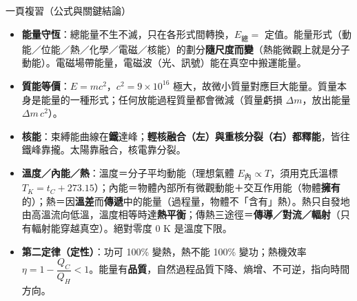 \documentclass[11pt]{article}
\begin{document}
\begin{補充框}{一頁複習（公式與關鍵結論）}
\begin{itemize}\setlength{\itemsep}{2pt}
\item \textbf{能量守恆}：總能量不生不滅，只在各形式間轉換，$E_{\text{總}}=$ 定值。能量形式（動能／位能／熱／化學／電磁／核能）的劃分\textbf{隨尺度而變}（熱能微觀上就是分子動能）。電磁場帶能量，電磁波（光、訊號）能在真空中搬運能量。
\item \textbf{質能等價}：$E=mc^2$，$c^2=9\times10^{16}$ 極大，故微小質量對應巨大能量。質量本身是能量的一種形式；任何放能過程質量都會微減（質量虧損 $\Delta m$，放出能量 $\Delta m\,c^2$）。
\item \textbf{核能}：束縛能曲線在\textbf{鐵}達峰；\textbf{輕核融合（左）與重核分裂（右）都釋能}，皆往鐵峰靠攏。太陽靠融合，核電靠分裂。
\item \textbf{溫度／內能／熱}：溫度＝分子平均動能（理想氣體 $E_{\text{內}}\propto T$，須用克氏溫標 $T_K=t_C+273.15$）；內能＝物體內部所有微觀動能＋交互作用能（物體\textbf{擁有}的）；熱＝因\textbf{溫差}而\textbf{傳遞}中的能量（過程量，物體不「含有」熱）。熱只自發地由高溫流向低溫，溫度相等時達\textbf{熱平衡}；傳熱三途徑＝\textbf{傳導／對流／輻射}（只有輻射能穿越真空）。絕對零度 0 K 是溫度下限。
\item \textbf{第二定律（定性）}：功可 100\% 變熱，熱不能 100\% 變功；熱機效率 $\eta=1-\dfrac{Q_C}{Q_H}<1$。能量有\textbf{品質}，自然過程品質下降、熵增、不可逆，指向時間方向。
\end{itemize}
\end{補充框}
\end{document}

